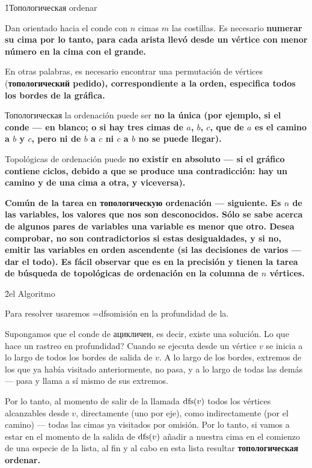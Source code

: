 \h1{Топологическая ordenar}

Dan orientado hacia el conde con $n$ cimas $m$ las costillas. Es necesario \bf{numerar} su cima por lo tanto, para cada arista llevó desde un vértice con menor número en la cima con el grande.

En otras palabras, es necesario encontrar una permutación de vértices (\bf{топологический pedido}), correspondiente a la orden, especifica todos los bordes de la gráfica.

Топологическая la ordenación puede ser \bf{no la única} (por ejemplo, si el conde --- en blanco; o si hay tres cimas de $a$, $b$, $c$, que de $a$ es el camino a $b$ y $c$, pero ni de $b$ a $c$ ni $c$ a $b$ no se puede llegar).

Topológicas de ordenación puede \bf{no existir} en absoluto --- si el gráfico contiene ciclos, debido a que se produce una contradicción: hay un camino y de una cima a otra, y viceversa).

\bf{Común de la tarea} en топологическую ordenación --- siguiente. Es $n$ de las variables, los valores que nos son desconocidos. Sólo se sabe acerca de algunos pares de variables una variable es menor que otro. Desea comprobar, no son contradictorios si estas desigualdades, y si no, emitir las variables en orden ascendente (si las decisiones de varios --- dar el todo). Es fácil observar que es en la precisión y tienen la tarea de búsqueda de topológicas de ordenación en la columna de $n$ vértices.


\h2{el Algoritmo}

Para resolver usaremos \algohref=dfs{omisión en la profundidad de la}.

Supongamos que el conde de ацикличен, es decir, existe una solución. Lo que hace un rastreo en profundidad? Cuando se ejecuta desde un vértice $v$ se inicia a lo largo de todos los bordes de salida de $v$. A lo largo de los bordes, extremos de los que ya había visitado anteriormente, no pasa, y a lo largo de todas las demás --- pasa y llama a sí mismo de sus extremos.

Por lo tanto, al momento de salir de la llamada ${\rm dfs}(v)$ todos los vértices alcanzables desde $v$, directamente (uno por eje), como indirectamente (por el camino) --- todas las cimas ya visitados por omisión. Por lo tanto, si vamos a estar en el momento de la salida de ${\rm dfs}(v)$ añadir a nuestra cima en el comienzo de una especie de la lista, al fin y al cabo en esta lista resultar \bf{топологическая ordenar}.

